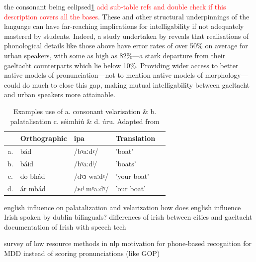 \documentclass[thesis]{cluu}
\newcommand{\todo}[1]{\textcolor{red}{#1}}
\newcommand{\ipa}[1]{{\ipafont #1}}
\begin{document}
the consonant being eclipsed\ref{tab:sound_contrasts} \todo{add sub-table refs and double check if this description covers all the bases}. These and other structural underpinnings of the language can have far-reaching implications for intelligability if not adequately mastered by students. Indeed, a study undertaken by \textcite{broinNewUrbanIrish2014} reveals that realisations of phonological details like those above have error rates of over 50\% on average for urban speakers, with some as high as 82\%---a stark departure from their gaeltacht counterparts which lie below 10\%. Providing wider access to better native models of pronunciation---not to mention native models of morphology---could do much to close this gap, making mutual intelligability between gaeltacht and urban speakers more attainable. 

\begin{table}[ht]
  \centering
  \caption{Examples use of a. consonant velarisation \& b. palatalisation c. séimhiú \& d. úru. Adapted from \textcite{nichasaideSPEECHTECHNOLOGYDOCUMENTATION2015}}
  \begin{tabular}{c|l|l|l|l}
     & Orthographic & \gls{ipa} & Translation \\
    \hline
    a. & bád & /\ipa{bˠaːdˠ}/ & 'boat' \\
    b. & báid & /\ipa{bˠaːdʲ}/ & 'boats' \\
    c. & do bhád & /\ipa{dˠɔ waːdˠ}/ & 'your boat'\\
    d. & ár mbád & /\ipa{ɛɾʲ mˠaːdˠ}/ & 'our boat'\\
  \end{tabular}
  \label{tab:sound_contrasts}
\end{table}

\textcite{gabrieleEnglishInfluenceL2} english influence on palatalization and velarization
\textcite{snesarevaPalatalizationDublinIrish2016} how does english influence Irish spoken by dublin bilinguals?
\textcite{broinNewUrbanIrish2014} differences of irish between cities and gaeltacht
\textcite{nichasaideSPEECHTECHNOLOGYDOCUMENTATION2015} documentation of Irish with speech tech

\textcite{magueresseLowresourceLanguagesReview2020} survey of low resource methods in \gls{nlp}
\textcite{wuTransformerBasedEndtoEnd2021} motivation for phone-based recognition for MDD instead of scoring pronunciations (like GOP)
\end{document}
